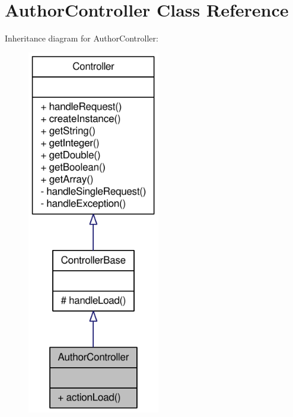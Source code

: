 \hypertarget{classAuthorController}{
\section{AuthorController Class Reference}
\label{classAuthorController}
}


Inheritance diagram for AuthorController:\nopagebreak
\begin{figure}[H]
\begin{center}
\leavevmode
\includegraphics[width=164pt]{classAuthorController__inherit__graph}
\end{center}
\end{figure}


